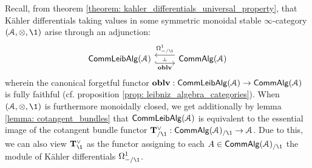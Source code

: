                     \begin{remark} \label{remark: cotangent_bundles_and_kahler_differentials}
                        Recall, from theorem \ref{theorem: kahler_differentials_universal_property}, that K\"ahler differentials taking values in some symmetric monoidal stable $\infty$-category $(\calA, \tensor, \1)$ arise through an adjunction:
                            $$
                                \begin{tikzcd}
                                	{\Comm\Leib\Alg(\calA)} & {\Comm\Alg(\calA)}
                                	\arrow[""{name=0, anchor=center, inner sep=0}, "\oblv"', shift right=2, hook, from=1-1, to=1-2]
                                	\arrow[""{name=1, anchor=center, inner sep=0}, "{\Omega^1_{-/\1}}"', shift right=2, from=1-2, to=1-1]
                                	\arrow["\dashv"{anchor=center, rotate=-90}, draw=none, from=1, to=0]
                                \end{tikzcd}
                            $$
                        wherein the canonical forgetful functor $\mathbf{oblv}: \mathsf{Comm}\mathsf{Leib}\mathsf{Alg}(\mathcal{A}) \to \mathsf{Comm}\mathsf{Alg}(\mathcal{A})$ is fully faithful (cf. proposition \ref{prop: leibniz_algebra_categories}). When $(\calA, \tensor, \1)$ is furthermore monoidally closed, we get additionally by lemma \ref{lemma: cotangent_bundles} that $\mathsf{Comm}\mathsf{Leib}\mathsf{Alg}(\mathcal{A})$ is equivalent to the essential image of the cotangent bundle functor $\bfT^{\vee}_{/\1}: \Comm\Alg(\calA)_{/\1} \to \calA$. Due to this, we can also view $\bfT^{\vee}_{\1}$ as the functor assigning to each $A \in \Comm\Alg(\calA)_{/\1}$ the module of K\"ahler differentials $\Omega^1_{-/\1}$.
                    \end{remark}
                
